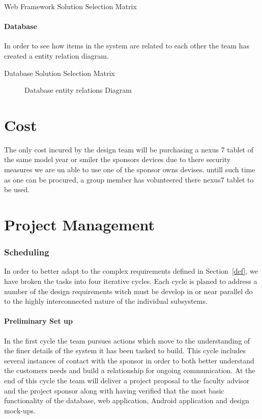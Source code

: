 \documentclass[Letter,11pt]{article}
\begin{document}
		
	
		\begin{table}[h]
			\centering
			
			\caption{\label{WebMatrix} Web Framework Solution Selection Matrix}
		\end{table}
	
	
	\subsection{Database}
		In order to see how items in the system are related to each other the team has created a entity relation diagram.
		\begin{table}[h]
			\centering
			
			\caption{\label{DBMatrix} Database Solution Selection Matrix}
		\end{table}
		
		\begin{figure}[h]
			\centering
			
			\caption{\label{ERdiogram} Database entity relations Diagram}
		\end{figure}
	

		
	
\part{Cost}
The only cost incured by the design team will be purchasing a nexus 7 tablet of the same model year or smiler the sponsors devices due to there security measures we are un able to use one of the sponsor owns devises. untill such time as one can be procured, a group member has volunteered there nexus7 tablet to be used.
\part{Project Management}
\section{Scheduling}
		In order to better adapt to the complex requirements defined in Section~\ref{def}, we have broken the tasks into four iterative cycles. Each cycle is planed to address a number of the design requirements witch must be develop in or near parallel do to the highly interconnected nature of the individual subsystems. 
		
		
	\subsection{Preliminary Set up}\label{cyc1}
		In the first cycle the team pursues actions which move to the understanding of the finer details of the system it has been tasked to build. This cycle includes several instances of contact with the sponsor in order to both better understand the customers needs and build a relationship for ongoing communication. At the end of this cycle the team will deliver a project proposal to the faculty advisor and the project sponsor along with having verified that the most basic functionality of the database, web application, Android application and design mock-ups. 
		
\end{document}

